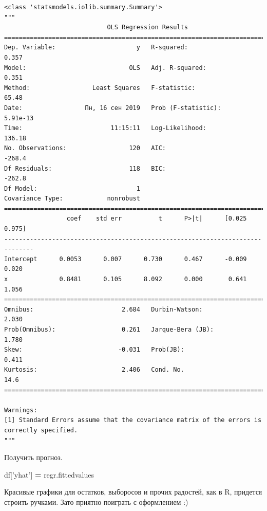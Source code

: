 \documentclass[]{book}
\newenvironment{Shaded}{\begin{snugshade}}{\end{snugshade}}
\newcommand{\NormalTok}[1]{#1}
\newcommand{\OperatorTok}[1]{\textcolor[rgb]{0.81,0.36,0.00}{\textbf{#1}}}
\newcommand{\StringTok}[1]{\textcolor[rgb]{0.31,0.60,0.02}{#1}}
\begin{document}
\begin{verbatim}
<class 'statsmodels.iolib.summary.Summary'>
"""
                            OLS Regression Results                            
==============================================================================
Dep. Variable:                      y   R-squared:                       0.357
Model:                            OLS   Adj. R-squared:                  0.351
Method:                 Least Squares   F-statistic:                     65.48
Date:                 Пн, 16 сен 2019   Prob (F-statistic):           5.91e-13
Time:                        11:15:11   Log-Likelihood:                 136.18
No. Observations:                 120   AIC:                            -268.4
Df Residuals:                     118   BIC:                            -262.8
Df Model:                           1                                         
Covariance Type:            nonrobust                                         
==============================================================================
                 coef    std err          t      P>|t|      [0.025      0.975]
------------------------------------------------------------------------------
Intercept      0.0053      0.007      0.730      0.467      -0.009       0.020
x              0.8481      0.105      8.092      0.000       0.641       1.056
==============================================================================
Omnibus:                        2.684   Durbin-Watson:                   2.030
Prob(Omnibus):                  0.261   Jarque-Bera (JB):                1.780
Skew:                          -0.031   Prob(JB):                        0.411
Kurtosis:                       2.406   Cond. No.                         14.6
==============================================================================

Warnings:
[1] Standard Errors assume that the covariance matrix of the errors is correctly specified.
"""
\end{verbatim}

Получить прогноз.

\begin{Shaded}
\begin{Highlighting}[]
\NormalTok{df[}\StringTok{'yhat'}\NormalTok{] }\OperatorTok{=}\NormalTok{ regr.fittedvalues}
\end{Highlighting}
\end{Shaded}

Красивые графики для остатков, выборосов и прочих радостей, как в R, придется строить ручками. Зато приятно поиграть с оформлением :)
\end{document}

